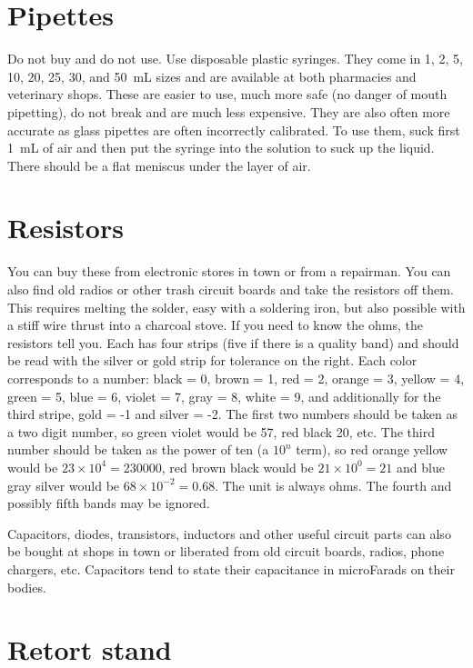 \section{Pipettes}
Do not buy and do not use. 
Use disposable plastic syringes. 
They come in 1, 
2, 
5, 
10, 
20, 
25, 
30, 
and 50~mL sizes and are available at both pharmacies and veterinary shops. 
These are easier to use, 
much more safe (no danger of mouth pipetting), 
do not break and are much less expensive. 
They are also often more accurate 
as glass pipettes are often incorrectly calibrated. 
To use them, 
suck first 1~mL of air and then put the syringe into the solution to suck up the liquid. 
There should be a flat meniscus under the layer of air.

\section{Resistors}
\label{sec:resistors}
You can buy these from electronic stores in town or from a repairman. 
You can also find old radios or other trash circuit boards 
and take the resistors off them. 
This requires melting the solder, 
easy with a soldering iron, 
but also possible with a stiff wire thrust into a charcoal stove. 
If you need to know the ohms, 
the resistors tell you. 
Each has four strips (five if there is a quality band) 
and should be read with the silver or gold strip for tolerance on the right. 
Each color corresponds to a number: black = 0, 
brown = 1, 
red = 2, 
orange = 3, 
yellow = 4, 
green = 5, 
blue = 6, 
violet = 7, 
gray = 8, 
white = 9, 
and additionally for the third stripe, 
gold = -1 and silver = -2. 
The first two numbers should be taken as a two digit number, 
so green violet would be 57, 
red black 20, 
etc. 
The third number should be taken as the power of ten (a $ 10^{n} $ term), 
so red orange yellow would be $ 23 \times 10^{4} = 230000 $, 
red brown black would be $ 21 \times 10^{0} = 21 $ 
and blue gray silver would be $ 68 \times 10^{-2} = 0.68 $. 
The unit is always ohms. 
The fourth and possibly fifth bands may be ignored.

Capacitors, 
diodes, 
transistors, 
inductors and other useful circuit parts can also be bought 
at shops in town or liberated from old circuit boards, 
radios, 
phone chargers, 
etc. 
Capacitors tend to state their capacitance in microFarads on their bodies.

\section{Retort stand}

